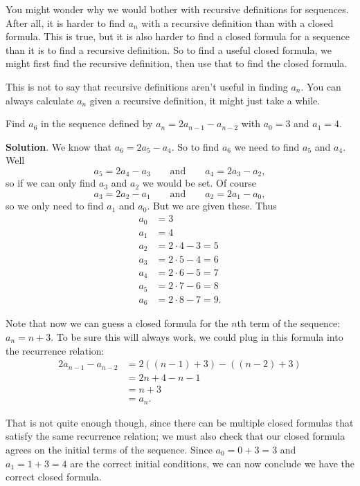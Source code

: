 \documentclass[11pt,]{book}
\theoremstyle{ptxplainnotitle}
\theoremstyle{ptxplaintitle}
\theoremstyle{ptxdefinitionnotitle}
\theoremstyle{ptxdefinitiontitle}
\theoremstyle{ptxdefinitionnotitle}
\theoremstyle{ptxdefinitiontitle}
\theoremstyle{ptxdefinitionnotitle}
\theoremstyle{ptxdefinitiontitle}
\theoremstyle{ptxdefinitiontitlenonumber}
\theoremstyle{ptxdefinitiontitlenonumber}
\numberwithin{equation}{chapter}
\newcommand{\amp}{&}
\begin{document}
\hypertarget{p-52}{}%
You might wonder why we would bother with recursive definitions for sequences. After all, it is harder to find \(a_n\) with a recursive definition than with a closed formula. This is true, but it is also harder to find a closed formula for a sequence than it is to find a recursive definition. So to find a useful closed formula, we might first find the recursive definition, then use that to find the closed formula.%
\par
\hypertarget{p-53}{}%
This is not to say that recursive definitions aren't useful in finding \(a_n\). You can always calculate \(a_n\) given a recursive definition, it might just take a while.%
\begin{example}\label{example-3}
\hypertarget{p-54}{}%
Find \(a_6\) in the sequence defined by \(a_n = 2a_{n-1} - a_{n-2}\) with \(a_0 = 3\) and \(a_1 = 4\).%
\par\smallskip%
\noindent\textbf{Solution}.\hypertarget{solution-2}{}\quad%
\hypertarget{p-55}{}%
We know that \(a_6 = 2a_5 - a_4\). So to find \(a_6\) we need to find \(a_5\) and \(a_4\). Well%
\begin{equation*}
a_5 = 2a_4 - a_3 \qquad \text{and} \qquad a_4 = 2a_3 - a_2,
\end{equation*}
so if we can only find \(a_3\) and \(a_2\) we would be set. Of course%
\begin{equation*}
a_3 = 2a_2 - a_1 \qquad \text{and} \qquad a_2 = 2a_1 - a_0,
\end{equation*}
so we only need to find \(a_1\) and \(a_0\). But we are given these. Thus%
\begin{align*}
a_0 \amp = 3\\
a_1 \amp = 4\\
a_2 \amp = 2\cdot 4 - 3 = 5\\
a_3 \amp = 2\cdot 5 - 4 = 6\\
a_4 \amp = 2\cdot 6 - 5 = 7\\
a_5 \amp = 2\cdot 7 - 6 = 8\\
a_6 \amp = 2\cdot 8 - 7 = 9.
\end{align*}
%
\par
\hypertarget{p-56}{}%
Note that now we can guess a closed formula for the \(n\)th term of the sequence: \(a_n = n+3\). To be sure this will always work, we could plug in this formula into the recurrence relation:%
\begin{align*}
2a_{n-1} - a_{n-2} \amp = 2((n-1) + 3) - ((n-2) + 3)\\
\amp = 2n + 4 - n - 1 \\
\amp = n + 3\\
\amp = a_n.
\end{align*}
%
\par
\hypertarget{p-57}{}%
That is not quite enough though, since there can be multiple closed formulas that satisfy the same recurrence relation; we must also check that our closed formula agrees on the initial terms of the sequence.  Since \(a_0 = 0 + 3 = 3\) and \(a_1 = 1+3 = 4\) are the correct initial conditions, we can now conclude we have the correct closed formula.%
\end{example}
\end{document}

